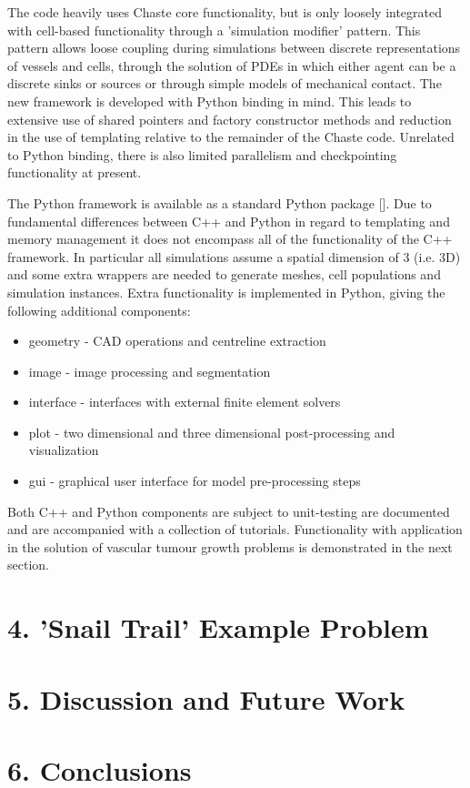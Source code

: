\documentclass[superscriptaddress, a4paper]{article}
\begin{document}
The code heavily uses Chaste core functionality, but is only loosely integrated with cell-based functionality through a 'simulation modifier' pattern. This pattern allows loose coupling during simulations between discrete representations of vessels and cells, through the solution of PDEs in which either agent can be a discrete sinks or sources or through simple models of mechanical contact. The new framework is developed with Python binding in mind. This leads to extensive use of shared pointers and factory constructor methods and reduction in the use of templating relative to the remainder of the Chaste code. Unrelated to Python binding, there is also limited parallelism and checkpointing functionality at present.

The Python framework is available as a standard Python package []. Due to fundamental differences between C++ and Python in regard to templating and memory management it does not encompass all of the functionality of the C++ framework. In particular all simulations assume a spatial dimension of 3 (i.e. 3D) and some extra wrappers are needed to generate meshes, cell populations and simulation instances. Extra functionality is implemented in Python, giving the following additional components:

\begin{itemize}
 \item geometry - CAD operations and centreline extraction
 \item image - image processing and segmentation
 \item interface - interfaces with external finite element solvers
 \item plot - two dimensional and three dimensional post-processing and visualization
 \item gui - graphical user interface for model pre-processing steps
\end{itemize}

Both C++ and Python components are subject to unit-testing are documented and are accompanied with a collection of tutorials. Functionality with application in the solution of vascular tumour growth problems is demonstrated in the next section.

\section{4. 'Snail Trail' Example Problem}
\label{sec:results}


\section{5. Discussion and Future Work}
\label{sec:discussion and future work}

\section{6. Conclusions}
\label{sec:conclusions}
\end{document}
